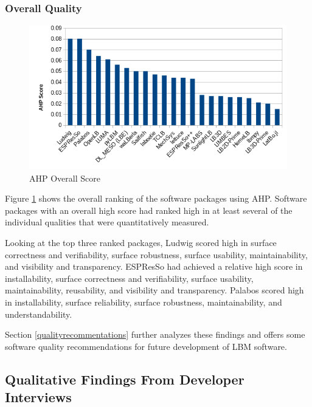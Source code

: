 \documentclass[12pt, notitlepage]{article}
\begin{document}
\subsubsection{Overall Quality}

\begin{figure}[h!]
	\begin{center}
		\includegraphics[width=1.0\textwidth]{finalscore_chart}
		\caption{AHP Overall Score}
		\label{Fig_OverallScore}
	\end{center}
\end{figure}

Figure \ref{Fig_OverallScore} shows the overall ranking of the software packages using AHP. Software packages with an overall high score had ranked high in at least several of the individual qualities that were quantitatively measured.

Looking at the top three ranked packages, Ludwig scored high in surface correctness and verifiability, surface robustness, surface usability, maintainability, and visibility and transparency. ESPResSo had achieved a relative high score in installability, surface correctness and verifiability, surface usability, maintainability, reusability, and visibility and transparency. Palabos scored high in installability, surface reliability, surface robustness, maintainability, and understandability. 

Section \ref{qualityrecommentations} further analyzes these findings and offers some software quality recommendations for future development of LBM software.

\subsection{Qualitative Findings From Developer Interviews}\label{interviewresults}
\end{document}
